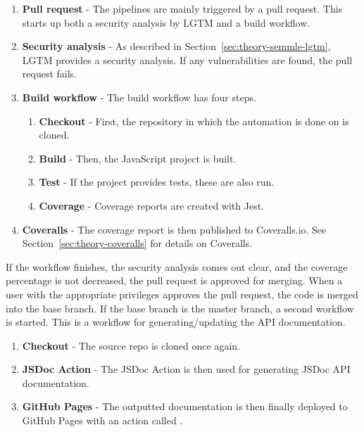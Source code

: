 \begin{enumerate}
    \item \textbf{Pull request} - The pipelines are mainly triggered by a pull request. This starts up both a security analysis by LGTM and a build workflow.
    \item \textbf{Security analysis} - As described in Section~\ref{sec:theory-semmle-lgtm}, LGTM provides a security analysis. If any vulnerabilities are found, the pull request fails.
    \item \textbf{Build workflow} - The build workflow has four steps.
    \begin{enumerate}
        \item \textbf{Checkout} - First, the repository in which the automation is done on is cloned.
        \item \textbf{Build} - Then, the JavaScript project is built.
        \item \textbf{Test} - If the project provides tests, these are also run.
        \item \textbf{Coverage} - Coverage reports are created with Jest.
    \end{enumerate}
    \item \textbf{Coveralls} - The coverage report is then published to Coveralls.io. See Section~\ref{sec:theory-coveralls} for details on Coveralls.
\end{enumerate}

If the workflow finishes, the security analysis comes out clear, and the coverage percentage is not decreased, the pull request is approved for merging. When a user with the appropriate privileges approves the pull request, the code is merged into the base branch. If the base branch is the master branch, a second workflow is started. This is a workflow for generating/updating the API documentation.

\begin{enumerate}
    \item \textbf{Checkout} - The source repo is cloned once again.
    \item \textbf{JSDoc Action} - The JSDoc Action is then used for generating JSDoc API documentation.
    \item \textbf{GitHub Pages} - The outputted documentation is then finally deployed to GitHub Pages with an action called \cite{github-pages-action}.
\end{enumerate}


